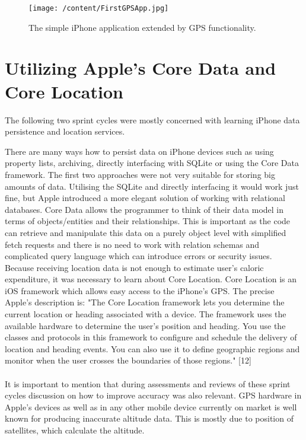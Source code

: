 \documentclass[12pt, a4paper]{report}   %
\begin{document}
\begin{enumerate}
\begin{figure}[H]
  \centering
	\texttt{[image: /content/FirstGPSApp.jpg]}
	  \caption{The simple iPhone application extended by GPS functionality.}
\end{figure}


\clearpage
\section{Utilizing Apple's Core Data and Core Location}
The following two sprint cycles were mostly concerned with learning iPhone data persistence and location services.

There are many ways how to persist data on iPhone devices such as using property lists, archiving, directly interfacing with SQLite or using the Core Data framework. The first two approaches were not very suitable for storing big amounts of data. Utilising the SQLite and directly interfacing it would work just fine, but Apple introduced a more elegant solution of working with relational databases. Core Data allows the programmer to think of their data model in terms of objects/entities and their relationships. This is important as the code can retrieve and manipulate this data on a purely object level with simplified fetch requests and there is no need to work with relation schemas and complicated query language which can introduce errors or security issues.
Because receiving location data is not enough to estimate user's caloric expenditure, it was necessary to learn about Core Location.
Core Location is an iOS framework which allows easy access to the iPhone's GPS. The precise Apple's description is:
"The Core Location framework lets you determine the current location or heading associated with a device. The framework uses the available hardware to determine the user's position and heading. You use the classes and protocols in this framework to configure and schedule the delivery of location and heading events. You can also use it to define geographic regions and monitor when the user crosses the boundaries of those regions." [12]\\ \\
It is important to mention that during assessments and reviews of these sprint cycles discussion on how to improve accuracy was also relevant. GPS hardware in Apple's devices as well as in any other mobile device currently on market is well known for producing inaccurate altitude data. This is mostly due to position of satellites, which calculate the altitude.\\ \\

\end{enumerate}
\end{document}

